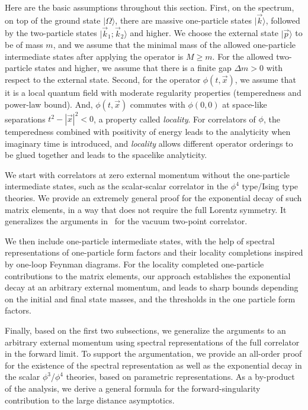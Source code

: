\documentclass[a4paper,11pt]{article}
\begin{document}
Here are the basic assumptions throughout this section. First, on the spectrum, on top of the ground state $|\Omega\rangle$, there are massive one-particle states $|\vec{k}\rangle$, followed by the two-particle states $|\vec{k}_1;\vec{k}_2\rangle$ and higher. We choose the external state $|\vec{p}\rangle$ to be of mass $m$, and we assume that the minimal mass of the allowed one-particle intermediate states after applying the operator is $M\ge m$. For the allowed two-particle states and higher, we assume that there is a finite gap $\Delta m>0$ with respect to the external state. Second, for the operator $\phi(t,\vec{x})$, we assume that it is a local quantum field with moderate regularity properties (temperedness and power-law bound). And, $\phi(t,\vec{x})$ commutes with $\phi(0,0)$ at space-like separations $t^2-|\vec{x}|^2<0 $, a property called {\it locality}. For correlators of $\phi$, the temperedness combined with positivity of energy leads to the analyticity when imaginary time is introduced, and {\it locality} allows different operator orderings to be glued together and leads to the spacelike analyticity. 

We start with correlators at zero external momentum without the one-particle intermediate states, such as the scalar-scalar correlator in the $\phi^4$ type/Ising type theories. We provide an extremely general proof for the exponential decay of such matrix elements, in a way that does not require the full Lorentz symmetry. It generalizes the arguments in~\cite{Fredenhagen:1984bz} for the vacuum two-point correlator. 

We then include one-particle intermediate states, with the help of spectral representations of one-particle form factors and their locality completions inspired by one-loop Feynman diagrams. For the locality completed one-particle contributions to the matrix elements, our approach establishes the exponential decay at an arbitrary external momentum, and leads to sharp bounds depending on the initial and final state masses, and the thresholds in the one particle form factors. 

Finally, based on the first two subsections, we generalize the arguments to an arbitrary external momentum using spectral representations of the full correlator in the forward limit. To support the argumentation, we provide an all-order proof for the existence of the spectral representation as well as the exponential decay in the scalar $\phi^3$/$\phi^4$ theories, based on parametric representations. As a by-product of the analysis, we derive a general formula for the forward-singularity contribution to the large distance asymptotics.
\end{document}
